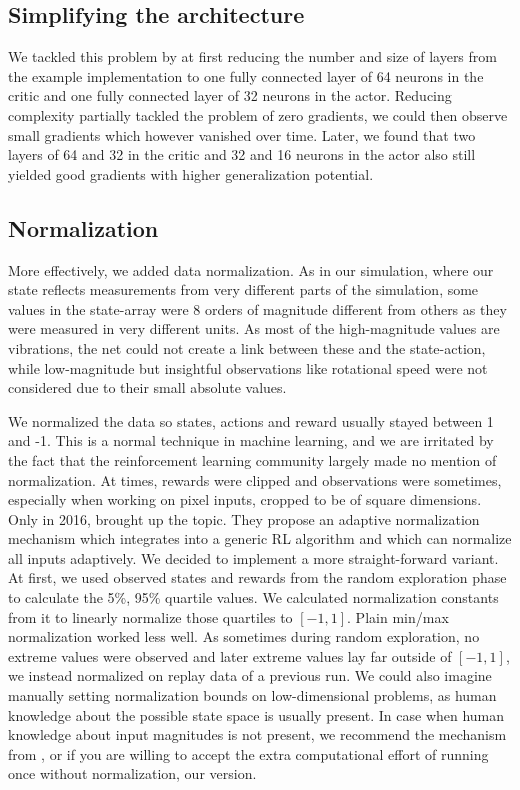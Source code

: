 \documentclass[hyperref,beleg]{cgvpub}
\begin{document}
\subsection{Simplifying the architecture}

We tackled this problem by at first reducing the number and size of layers from the example implementation to one fully connected layer of 64 neurons in the critic and one fully connected layer of 32 neurons in the actor. Reducing complexity partially tackled the problem of zero gradients, we could then observe small gradients which however vanished over time. Later, we found that two layers of 64 and 32 in the critic and 32 and 16 neurons in the actor also still yielded good gradients with higher generalization potential.

\subsection{Normalization}

More effectively, we added data normalization. As in our simulation, where our state reflects measurements from very different parts of the simulation, some values in the state-array were 8 orders of magnitude different from others as they were measured in very different units. As most of the high-magnitude values are vibrations, the net could not create a link between these and the state-action, while low-magnitude but insightful observations like rotational speed were not considered due to their small absolute values. 

We normalized the data so states, actions and reward usually stayed between 1 and -1. This is a normal technique in machine learning, and we are irritated by the fact that the reinforcement learning community largely made no mention of normalization. At times, rewards were clipped \cite{mnihPlayingAtariDeep2013} and observations were sometimes, especially when working on pixel inputs, cropped to be of square dimensions. Only in 2016, \cite{vanhasseltLearningValuesMany2016} brought up the topic. They propose an adaptive normalization mechanism which integrates into a generic \ac{RL} algorithm and which can normalize all inputs adaptively. We decided to implement a more straight-forward variant. At first, we used observed states and rewards from the random exploration phase to calculate the 5\%, 95\% quartile values. We calculated normalization constants from it to linearly normalize those quartiles to $[-1, 1]$. Plain min/max normalization worked less well. As sometimes during random exploration, no extreme values were observed and later extreme values lay far outside of $[-1, 1]$, we instead normalized on replay data of a previous run. We could also imagine manually setting normalization bounds on low-dimensional problems, as human knowledge about the possible state space is usually present. In case when human knowledge about input magnitudes is not present, we recommend the mechanism from \cite{vanhasseltLearningValuesMany2016}, or if you are willing to accept the extra computational effort of running once without normalization, our version.
\end{document}
